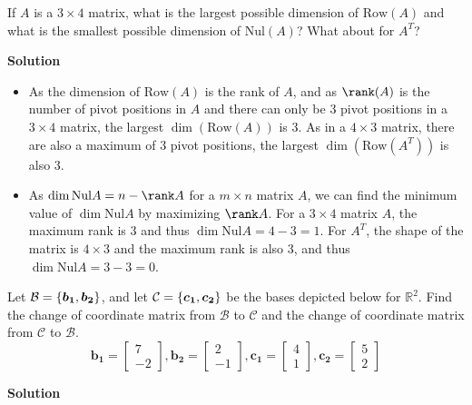 \documentclass[11pt]{scrartcl}
\theoremstyle{dotlessP}
\theoremstyle{dotlessN}
\DeclarePairedDelimiter\set{\{}{\}}
\newcommand{\reals}{\mathbb{R}} %
\newcommand{\nul}{\text{Nul}}
\newcommand{\row}{\text{Row}}
\newcommand{\basis}{\mathcal{B}}
\begin{document}
\begin{ques}
	If $A$ is a $3 \times 4$ matrix, what is the largest possible dimension of $\row(A)$ and what is the smallest possible dimension of $\nul(A)$? What about for $A^T$?
\end{ques}
\textbf{Solution}
\begin{itemize}
	\item As the dimension of $\row(A)$ is the rank of $A$, and as $\rank(A)$ is the number of pivot positions in $A$ and there can only be  3 pivot positions in a $3 \times 4$ matrix, the largest $\dim(\row(A))$ is 3. As in a $4 \times 3$ matrix, there are also a maximum of 3 pivot positions, the largest $\dim(\row(A^T))$ is also 3.
	\item As $\dim \nul A = n - \rank A$ for a $m \times n$ matrix $A$, we can find the minimum value of $\dim \nul A$ by maximizing $\rank A$. For a $3 \times 4$ matrix $A$, the maximum rank is 3 and thus $\dim \nul A = 4 - 3 = 1$. For $A^T$, the shape of the matrix is $4 \times 3$ and the maximum rank is also 3, and thus  $\dim \nul A = 3 - 3 = 0$.
\end{itemize}
\begin{ques}
	Let $\basis = \set*{\bm{b_1}, \bm{b_2}}$, and let $\mathcal{C} = \set*{\bm{c_1}, \bm{c_2}}$ be the bases depicted below for $\reals^2$. Find the change of coordinate matrix from $\basis$ to $\mathcal{C}$ and the change of coordinate matrix from $\mathcal{C}$ to $\basis$.
	\[
		\bm{b_1} = 
		\begin{bmatrix}
	7 \\
	-2
		\end{bmatrix},
		\bm{b_2} = 
		\begin{bmatrix}
			2 \\
			-1
		\end{bmatrix},
		\bm{c_1} =
		\begin{bmatrix}
			4 \\
			1
		\end{bmatrix},
		\bm{c_2} = 
		\begin{bmatrix}
			5 \\
			2
		\end{bmatrix}
	\] 
\end{ques}
\textbf{Solution}
\end{document}
